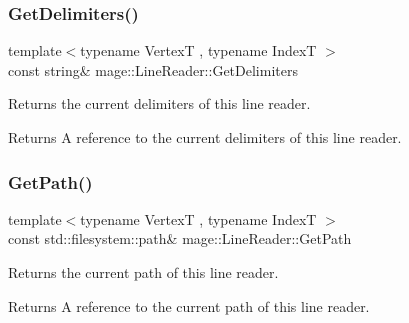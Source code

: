 \subsubsection{\texorpdfstring{Get\+Delimiters()}{GetDelimiters()}}
{\footnotesize\ttfamily template$<$typename VertexT , typename IndexT $>$ \\
const string\& mage\+::\+Line\+Reader\+::\+Get\+Delimiters\hspace{0.3cm}{\ttfamily [noexcept]}}

Returns the current delimiters of this line reader.

\begin{DoxyReturn}{Returns}
A reference to the current delimiters of this line reader. 
\end{DoxyReturn}
\mbox{\label{classmage_1_1rendering_1_1loader_1_1_o_b_j_reader_a9740b3cecdcf5a27c696a08eef3b09da}} 
\subsubsection{\texorpdfstring{Get\+Path()}{GetPath()}}
{\footnotesize\ttfamily template$<$typename VertexT , typename IndexT $>$ \\
const std\+::filesystem\+::path\& mage\+::\+Line\+Reader\+::\+Get\+Path\hspace{0.3cm}{\ttfamily [noexcept]}}

Returns the current path of this line reader.

\begin{DoxyReturn}{Returns}
A reference to the current path of this line reader. 
\end{DoxyReturn}
\mbox{\label{classmage_1_1rendering_1_1loader_1_1_o_b_j_reader_a006549a7f9724580c7fdae2f7a9c7bdf}} 
